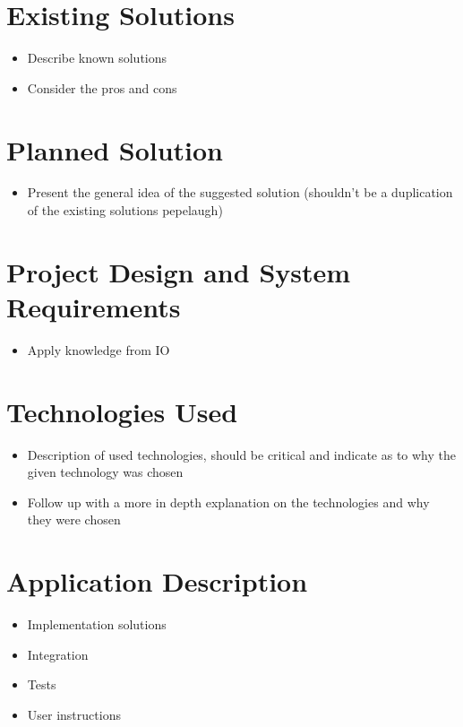 \documentclass[a4paper, 12pt]{article} \linespread{1.3}
\begin{document}
\section{Existing Solutions}
\begin{itemize}
    \item Describe known solutions
    \item Consider the pros and cons 
\end{itemize}

\section{Planned Solution}
\begin{itemize}
    \item Present the general idea of the suggested solution (shouldn't be
        a duplication of the existing solutions pepelaugh)
\end{itemize}

\section{Project Design and System Requirements}
\begin{itemize}
    \item Apply knowledge from IO
\end{itemize}

\section{Technologies Used}
\begin{itemize}
    \item Description of used technologies, should be critical and indicate as
        to why the given technology was chosen
    \item Follow up with a more in depth explanation on the technologies and why
        they were chosen
\end{itemize}

\section{Application Description}
\begin{itemize}
    \item Implementation solutions
    \item Integration
    \item Tests
    \item User instructions
\end{itemize}
\end{document}
